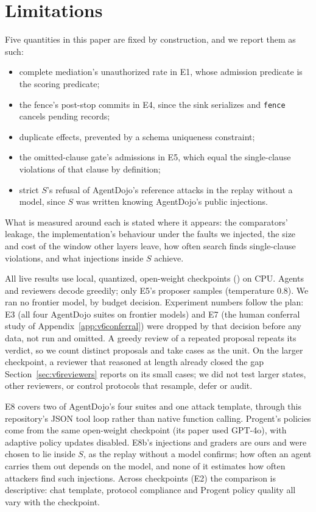 \section{Limitations}\label{sec:v6limits}

 Five quantities in this paper are fixed by construction, and we report them as such:
\begin{itemize}
  \item complete mediation's unauthorized rate in E1, whose admission predicate is the scoring predicate;
  \item the fence's post-stop commits in E4, since the sink serializes and \texttt{fence} cancels pending records;
  \item duplicate effects, prevented by a schema uniqueness constraint;
  \item the omitted-clause gate's admissions in E5, which equal the single-clause violations of that clause by
        definition;
  \item strict \(S\)'s refusal of AgentDojo's reference attacks in the replay without a model, since \(S\) was
        written knowing AgentDojo's public injections.
\end{itemize}
What is measured around each is stated where it appears: the comparators' leakage, the implementation's behaviour
under the faults we injected, the size and cost of the window other layers leave, how often search finds single-clause
violations, and what injections inside \(S\) achieve.

 All live results use local, quantized, open-weight checkpoints (\vsixCheckpointList) on CPU.
Agents and reviewers decode greedily; only E5's proposer samples (temperature 0.8). We ran no frontier model, by budget
decision. Experiment numbers follow the plan: E3 (all four AgentDojo suites on frontier models) and E7 (the human
conferral study of Appendix~\ref{app:v6conferral}) were dropped by that decision before any data, not run and omitted. A greedy review of a repeated proposal repeats its verdict, so we count distinct proposals and take cases as
the unit. On the larger checkpoint, a reviewer that reasoned at length already closed the gap
Section~\ref{sec:v6reviewers} reports on its small cases; we did not test larger states, other reviewers, or control
protocols that resample, defer or audit.

 E8 covers two of AgentDojo's four suites and one attack template, through this repository's
JSON tool loop rather than native function calling. Progent's policies come from the same open-weight checkpoint (its
paper used GPT-4o), with adaptive policy updates disabled. E8b's injections and graders are ours and were chosen to lie
inside \(S\), as the replay without a model confirms; how often an agent carries them out depends on the model, and
none of it estimates how often attackers find such injections. Across checkpoints (E2)
the comparison is descriptive: chat template, protocol compliance and Progent policy quality all vary with the
checkpoint.

